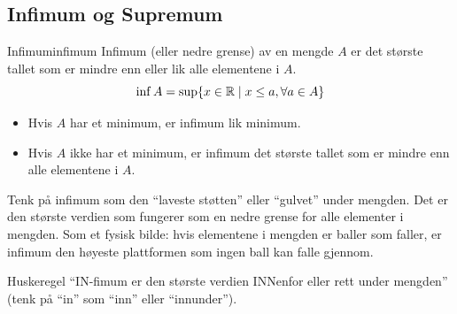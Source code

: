 \subsection{Infimum og Supremum}
\begin{definition}{Infimum}{infimum}
	Infimum (eller nedre grense) av en mengde \(A\) er det største tallet som er mindre enn eller lik alle elementene i \(A\).
	\[
		\inf A = \sup \{x \in \mathbb{R} \mid x \leq a, \forall a \in A\}
	\]
	\begin{itemize}
		\item Hvis \(A\) har et minimum, er infimum lik minimum.
		\item Hvis \(A\) ikke har et minimum, er infimum det største tallet som er mindre enn alle elementene i \(A\).
	\end{itemize}
\end{definition}

Tenk på infimum som den \enquote{laveste støtten} eller \enquote{gulvet} under mengden. Det er den største verdien som fungerer som en nedre grense for alle elementer i mengden. Som et fysisk bilde: hvis elementene i mengden er baller som faller, er infimum den høyeste plattformen som ingen ball kan falle gjennom.

\begin{remark}{Huskeregel}{}
	\enquote{IN-fimum er den største verdien INNenfor eller rett under mengden} (tenk på \enquote{in} som \enquote{inn} eller \enquote{innunder}).
\end{remark}

